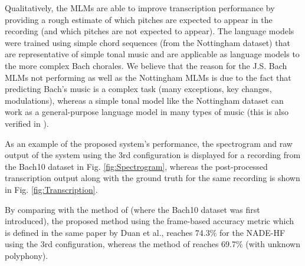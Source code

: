 Qualitatively, the MLMs are able to improve transcription performance by providing a rough estimate of which pitches are expected to appear in the recording (and which pitches are not expected to appear). The language models were trained using simple chord sequences (from the Nottingham dataset) that are representative of simple tonal music and are applicable as language models to the more complex Bach chorales. We believe that the reason for the J.S. Bach MLMs not performing as well as the Nottingham MLMs is due to the fact that predicting Bach's music is a complex task (many exceptions, key changes, modulations), whereas a simple tonal model like the Nottingham dataset can work as a general-purpose language model in many types of music (this is also verified in \cite{Boulanger-Lewandowski2012}).

As an example of the proposed system's performance, the spectrogram and raw output of the system using the 3rd configuration is displayed for a recording from the Bach10 dataset in Fig. \ref{fig:Spectrogram}, whereas the post-processed transcription output along with the ground truth for the same recording is shown in Fig. \ref{fig:Transcription}.

By comparing with the method of \cite{Duan2010} (where the Bach10 dataset was first introduced), the proposed method using the frame-based accuracy metric which is defined in the same paper by Duan et al., reaches 74.3\% for the NADE-HF using the 3rd configuration, whereas the method of \cite{Duan2010} reaches 69.7\% (with unknown polyphony).

\begin{table}[t]
 \begin{center}
\end{center}
\vspace{-0.1in}
 \caption{Transcription results using various system configurations.}
 \label{tab:results}
\end{table}


